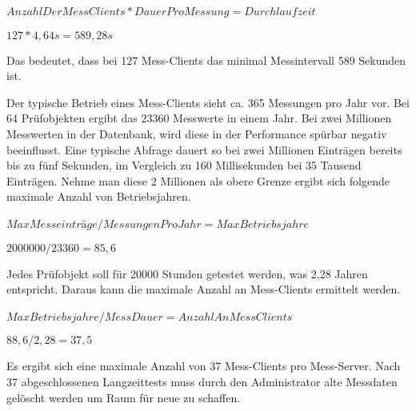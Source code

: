 \begin{center}
{\large$AnzahlDerMessClients * DauerProMessung = Durchlaufzeit$}\ 


{\large$127 * 4,64 s = 589,28 s$}
\end{center}

Das bedeutet, dass bei 127 Mess-Clients das minimal Messintervall 589 Sekunden ist.\ 

Der typische Betrieb eines Mess-Clients sieht ca. 365 Messungen pro Jahr vor. Bei 64 Prüfobjekten ergibt das 23360 Messwerte in einem Jahr. Bei zwei Millionen Messwerten in der Datenbank, wird diese in der Performance spürbar negativ beeinflusst. Eine typische Abfrage dauert so bei zwei Millionen Einträgen bereits bis zu fünf Sekunden, im Vergleich zu 160 Millisekunden bei 35 Tausend Einträgen. Nehme man diese 2 Millionen als obere Grenze ergibt sich folgende maximale Anzahl von Betriebsjahren.

\begin{center}
{\large$MaxMesseinträge / MessungenProJahr = MaxBetriebsjahre$}\ 


{\large$2000000 / 23360 = 85,6$}
\end{center}

Jedes Prüfobjekt soll für 20000 Stunden getestet werden, was 2,28 Jahren entspricht. Daraus kann die maximale Anzahl an Mess-Clients ermittelt werden.

\begin{center}
{\large$MaxBetriebsjahre / MessDauer = AnzahlAnMessClients$}\ 


{\large$88,6 / 2,28 = 37,5$}
\end{center}

Es ergibt sich eine maximale Anzahl von 37 Mess-Clients pro Mess-Server. Nach 37 abgeschlossenen Langzeittests muss durch den Administrator alte Messdaten gelöscht werden um Raum für neue zu schaffen.
